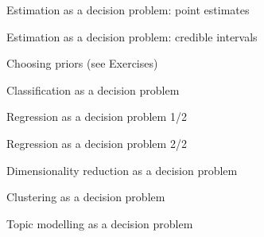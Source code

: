 \documentclass[10pt]{beamer}
\begin{document}
\begin{frame}{Estimation as a decision problem: point estimates}
\end{frame}

\begin{frame}{Estimation as a decision problem: credible intervals}
\end{frame}

\begin{frame}{Choosing priors (see Exercises)}
\end{frame}

\begin{frame}{Classification as a decision problem}
\end{frame}

\begin{frame}{Regression as a decision problem 1/2}
\end{frame}

\begin{frame}{Regression as a decision problem 2/2}
\end{frame}

\begin{frame}{Dimensionality reduction as a decision problem}
\end{frame}

\begin{frame}{Clustering as a decision problem}
\end{frame}

\begin{frame}{Topic modelling as a decision problem}
\end{frame}

\end{document}
